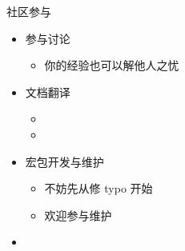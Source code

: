 \begin{frame}{社区参与}
  \begin{itemize}
    \item 参与讨论
          \begin{itemize}
            \item 你的经验也可以解他人之忧
          \end{itemize}
    \item 文档翻译
          \begin{itemize}
            \item {} 
            \item {} 
          \end{itemize}
    \item 宏包开发与维护
          \begin{itemize}
            \item 不妨先从修 typo 开始
            \item 欢迎参与维护 \hithesis
          \end{itemize}
    \item {}
  \end{itemize}
\end{frame}
